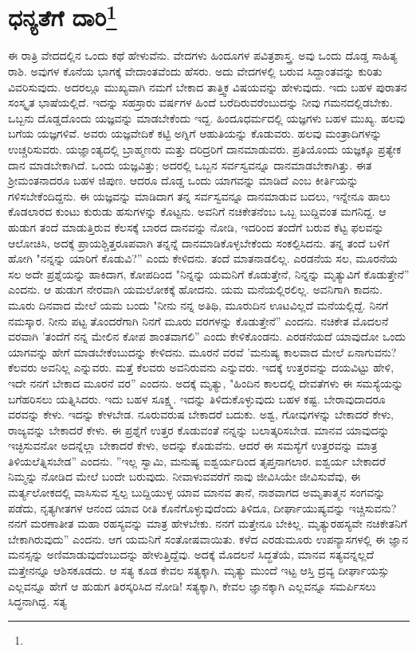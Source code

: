 
\chapter{ಧನ್ಯತೆಗೆ ದಾರಿ\protect\footnote{}}

ಈ ರಾತ್ರಿ ವೇದದಲ್ಲಿನ ಒಂದು ಕಥೆ ಹೇಳುವೆನು. ವೇದಗಳು ಹಿಂದೂಗಳ ಪವಿತ್ರಶಾಸ್ತ್ರ. ಅವು ಒಂದು ದೊಡ್ಡ ಸಾಹಿತ್ಯ ರಾಶಿ. ಅವುಗಳ ಕೊನೆಯ ಭಾಗಕ್ಕೆ ವೇದಾಂತವೆಂದು ಹೆಸರು. ಅದು ವೇದಗಳಲ್ಲಿ ಬರುವ ಸಿದ್ದಾಂತವನ್ನು ಕುರಿತು ವಿವರಿಸುವುದು. ಅದರಲ್ಲೂ ಮುಖ್ಯವಾಗಿ ನಮಗೆ ಬೇಕಾದ ತಾತ್ತ್ವಿಕ ವಿಷಯವನ್ನು ಹೇಳುವುದು. ಇದು ಬಹಳ ಪುರಾತನ ಸಂಸ್ಕೃತ ಭಾಷೆಯಲ್ಲಿದೆ. ಇದನ್ನು ಸಹಸ್ರಾರು ವರ್ಷಗಳ ಹಿಂದೆ ಬರೆದಿರುವರೆಂಬುದನ್ನು ನೀವು ಗಮನದಲ್ಲಿಡಬೇಕು. ಒಬ್ಬನು ದೊಡ್ಡದೊಂದು ಯಜ್ಞವನ್ನು ಮಾಡಬೇಕೆಂದು ಇದ್ದ. ಹಿಂದೂಧರ್ಮದಲ್ಲಿ ಯಜ್ಞಗಳು ಬಹಳ ಮುಖ್ಯ. ಹಲವು ಬಗೆಯ ಯಜ್ಞಗಳಿವೆ. ಅವರು ಯಜ್ಞವೇದಿಕೆ ಕಟ್ಟಿ ಅಗ್ನಿಗೆ ಆಹುತಿಯನ್ನು ಕೊಡುವರು. ಹಲವು ಮಂತ್ರಾದಿಗಳನ್ನು ಉಚ್ಚರಿಸುವರು. ಯಜ್ಞಾಂತ್ಯದಲ್ಲಿ ಬ್ರಾಹ್ಮಣರು ಮತ್ತು ದರಿದ್ರರಿಗೆ ದಾನಮಾಡುವರು. ಪ್ರತಿಯೊಂದು ಯಜ್ಞಕ್ಕೂ ಪ್ರತ್ಯೇಕ ದಾನ ಮಾಡಬೇಕಾಗಿದೆ. ಒಂದು ಯಜ್ಞವಿತ್ತು; ಅದರಲ್ಲಿ ಒಬ್ಬನ ಸರ್ವಸ್ವವನ್ನೂ ದಾನಮಾಡಬೇಕಾಗಿತ್ತು. ಈತ ಶ‍್ರೀಮಂತನಾದರೂ ಬಹಳ ಜಿಪುಣ. ಆದರೂ ದೊಡ್ಡ ಒಂದು ಯಾಗವನ್ನು ಮಾಡಿದೆ ಎಂಬ ಕೀರ್ತಿಯನ್ನು ಗಳಿಸಬೇಕೆಂದಿದ್ದನು. ಈ ಯಜ್ಞವನ್ನು ಮಾಡಿದಾಗ ತನ್ನ ಸರ್ವಸ್ವವನ್ನೂ ದಾನಮಾಡುವ ಬದಲು, ಇನ್ನೇನೂ ಹಾಲು ಕೊಡಲಾರದ ಕುಂಟು ಕುರುಡು ಹಸುಗಳನ್ನು ಕೊಟ್ಟನು. ಅವನಿಗೆ ನಚಿಕೇತನೆಂಬ ಒಬ್ಬ ಬುದ್ದಿವಂತ ಮಗನಿದ್ದ. ಆ ಹುಡುಗ ತಂದೆ ಮಾಡುತ್ತಿರುವ ಕೆಲಸಕ್ಕೆ ಬಾರದ ದಾನವನ್ನು ನೋಡಿ, ಇದರಿಂದ ತಂದೆಗೆ ಬರುವ ಕೆಟ್ಟ ಫಲವನ್ನು ಆಲೋಚಿಸಿ, ಅದಕ್ಕೆ ಪ್ರಾಯಶ್ಚಿತ್ತರೂಪವಾಗಿ ತನ್ನನ್ನೆ ದಾನಮಾಡಿಕೊಳ್ಳಬೇಕೆಂದು ಸಂಕಲ್ಪಿಸಿದನು. ತನ್ನ ತಂದೆ ಬಳಿಗೆ ಹೋಗಿ "ನನ್ನನ್ನು ಯಾರಿಗೆ ಕೊಡುವಿ?'' ಎಂದು ಕೇಳಿದನು. ತಂದೆ ಮಾತನಾಡಲಿಲ್ಲ. ಎರಡನೆಯ ಸಲ, ಮೂರನೆಯ ಸಲ ಅದೇ ಪ್ರಶ್ನೆಯನ್ನು ಹಾಕಿದಾಗ, ಕೋಪದಿಂದ "ನಿನ್ನನ್ನು ಯಮನಿಗೆ ಕೊಡುತ್ತೇನೆ, ನಿನ್ನನ್ನು ಮೃತ್ಯುವಿಗೆ ಕೊಡುತ್ತೇನೆ'' ಎಂದನು. ಆ ಹುಡುಗ ನೇರವಾಗಿ ಯಮಲೋಕಕ್ಕೆ ಹೋದನು. ಯಮ ಮನೆಯಲ್ಲಿರಲಿಲ್ಲ. ಅವನಿಗಾಗಿ ಕಾದನು. ಮೂರು ದಿನವಾದ ಮೇಲೆ ಯಮ ಬಂದು "ನೀನು ನನ್ನ ಅತಿಥಿ, ಮೂರುದಿನ ಊಟವಿಲ್ಲದೆ ಮನೆಯಲ್ಲಿದ್ದೆ. ನಿನಗೆ ನಮಸ್ಕಾರ. ನೀನು ಪಟ್ಟ ತೊಂದರೆಗಾಗಿ ನಿನಗೆ ಮೂರು ವರಗಳನ್ನು ಕೊಡುತ್ತೇನೆ” ಎಂದನು. ನಚಿಕೇತ ಮೊದಲನೆ ವರವಾಗಿ 'ತಂದೆಗೆ ನನ್ನ ಮೇಲಿನ ಕೋಪ ಶಾಂತವಾಗಲಿ'' ಎಂದು ಕೇಳಿಕೊಂಡನು. ಎರಡನೆಯದೆ ಯಾವುದೋ ಒಂದು ಯಾಗವನ್ನು ಹೇಗೆ ಮಾಡಬೇಕೆಂಬುದನ್ನು ಕೇಳಿದನು. ಮೂರನೆ ವರವೆ 'ಮನುಷ್ಯ ಕಾಲವಾದ ಮೇಲೆ ಏನಾಗುವನು? ಕೆಲವರು ಅವನಿಲ್ಲ ಎನ್ನುವರು. ಮತ್ತೆ ಕೆಲವರು ಅವನಿರುವನು ಎನ್ನುವರು. ಇದಕ್ಕೆ ಉತ್ತರವನ್ನು ದಯವಿಟ್ಟು ಹೇಳಿ, ಇದೇ ನನಗೆ ಬೇಕಾದ ಮೂರನೆ ವರ'' ಎಂದನು. ಅದಕ್ಕೆ ಮೃತ್ಯು, "ಹಿಂದಿನ ಕಾಲದಲ್ಲಿ ದೇವತೆಗಳು ಈ ಸಮಸ್ಯೆಯನ್ನು ಬಗೆಹರಿಸಲು ಯತ್ನಿಸಿದರು. ಇದು ಬಹಳ ಸೂಕ್ಷ್ಮ. ಇದನ್ನು ತಿಳಿದುಕೊಳ್ಳುವುದು ಬಹಳ ಕಷ್ಟ. ಬೇರಾವುದಾದರೂ ವರವನ್ನು ಕೇಳು. ಇದನ್ನು ಕೇಳಬೇಡ. ನೂರುವರುಷ ಬೇಕಾದರೆ ಬದುಕು. ಅಶ್ವ, ಗೋವುಗಳನ್ನು ಬೇಕಾದರೆ ಕೇಳು, ರಾಜ್ಯವನ್ನು ಬೇಕಾದರೆ ಕೇಳು. ಈ ಪ್ರಶ್ನೆಗೆ ಉತ್ತರ ಕೊಡುವಂತೆ ನನ್ನನ್ನು ಬಲಾತ್ಕರಿಸಬೇಡ. ಮಾನವ ಯಾವುದನ್ನು ಇಚ್ಛಿಸುವನೋ ಅದನ್ನೆಲ್ಲಾ ಬೇಕಾದರೆ ಕೇಳು, ಅದನ್ನು ಕೊಡುವೆನು. ಆದರೆ ಈ ಸಮಸ್ಯೆಗೆ ಉತ್ತರವನ್ನು ಮಾತ್ರ ತಿಳಿಯಲೆತ್ನಿಸಬೇಡ'' ಎಂದನು. ''ಇಲ್ಲ ಸ್ವಾಮಿ, ಮನುಷ್ಯ ಐಶ್ವರ್ಯದಿಂದ ತೃಪ್ತನಾಗಲಾರ. ಐಶ್ವರ್ಯ ಬೇಕಾದರೆ ನಿಮ್ಮನ್ನು ನೋಡಿದ ಮೇಲೆ ಬಂದೇ ಬರುವುದು. ನೀವಾಳುವವರೆಗೆ ನಾವು ಜೀವಿಸಿಯೇ ಜೀವಿಸುವೆವು, ಈ ಮರ್ತ್ಯಲೋಕದಲ್ಲಿ ವಾಸಿಸುವ ಸ್ವಲ್ಪ ಬುದ್ದಿಯುಳ್ಳ ಯಾವ ಮಾನವ ತಾನೆ, ನಾಶವಾಗದ ಅಮೃತಾತ್ಮನ ಸಂಗವನ್ನು ಪಡೆದು, ನೃತ್ಯಗೀತಗಳ ಆನಂದ ಯಾವ ರೀತಿ ಕೊನೆಗೊಳ್ಳುವುದೆಂದು ತಿಳಿದೂ, ದೀರ್ಘಾಯುಷ್ಯವನ್ನು ಇಚ್ಚಿಸುವನು? ನನಗೆ ಮರಣಾತೀತ ಮಹಾ ರಹಸ್ಯವನ್ನು ಮಾತ್ರ ಹೇಳಬೇಕು. ನನಗೆ ಮತ್ತೇನೂ ಬೇಕಿಲ್ಲ. ಮೃತ್ಯುರಹಸ್ಯವೇ ನಚಿಕೇತನಿಗೆ ಬೇಕಾಗಿರುವುದು” ಎಂದನು. ಆಗ ಯಮನಿಗೆ ಸಂತೋಷವಾಯಿತು. ಕಳೆದ ಎರಡುಮೂರು ಉಪನ್ಯಾಸಗಳಲ್ಲಿ ಈ ಜ್ಞಾನ ಮನಸ್ಸನ್ನು ಅಣಿಮಾಡುವುದೆಂಬುದನ್ನು ಹೇಳುತ್ತಿದ್ದೆವು. ಅದಕ್ಕೆ ಮೊದಲನೆ ಸಿದ್ಧತೆಯೆ, ಮಾನವ ಸತ್ಯವನ್ನಲ್ಲದೆ ಮತ್ತೇನನ್ನೂ ಆಶಿಸಕೂಡದು. ಆ ಸತ್ಯ ಕೂಡ ಕೇವಲ ಸತ್ಯಕ್ಕಾಗಿ. ಮೃತ್ಯು ಮುಂದೆ ಇಟ್ಟ ಆಸ್ತಿ ದ್ರವ್ಯ ದೀರ್ಘಾಯಸ್ಸು ಎಲ್ಲವನ್ನೂ ಹೇಗೆ ಆ ಹುಡುಗ ತಿರಸ್ಕರಿಸಿದ ನೋಡಿ! ಸತ್ಯಕ್ಕಾಗಿ, ಕೇವಲ ಜ್ಞಾನಕ್ಕಾಗಿ ಎಲ್ಲವನ್ನೂ ಸಮರ್ಪಿಸಲು ಸಿದ್ಧನಾಗಿದ್ದ. ಸತ್ಯ 